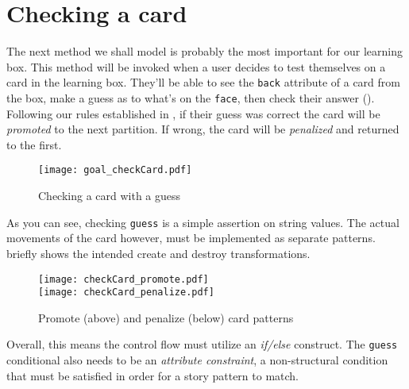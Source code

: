 \newpage
\hypertarget{sec:checkCard}{}
\section{Checking a card}
\genHeader

The next method we shall model is probably the most important for our learning box. This method will be invoked when a user decides to test themselves on a card
in the learning box. They'll be able to see the \texttt{back} attribute of a card from the box, make a guess as to what's on the \texttt{face}, then 
check their answer (). Following our rules established in , if their guess was correct the card will be
\emph{promoted} to the next partition. If wrong, the card will be \emph{penalized} and returned to the first.

\begin{figure}[htbp]
 	\centering
   \texttt{[image: goal\_checkCard.pdf]}
 	\caption{Checking a card with a guess}
 	\label{fig:goal_check}
\end{figure}
\FloatBarrier

As you can see, checking \texttt{guess} is a simple assertion on string values. The actual movements of the card however, must be implemented as separate
patterns.  briefly shows the intended create and destroy transformations.

\begin{figure}[htbp]
 	\centering
   \texttt{[image: checkCard\_promote.pdf]}
   \\ \vspace{1cm}
    \texttt{[image: checkCard\_penalize.pdf]}
 	\caption{Promote (above) and penalize (below) card patterns}
 	\label{fig:patterns_check}
\end{figure}
\FloatBarrier

Overall, this means the control flow must utilize an \emph{if/else} construct. The \texttt{guess} conditional also needs to be an \emph{attribute
constraint}, a non-structural condition that must be satisfied in order for a story pattern to match. 


